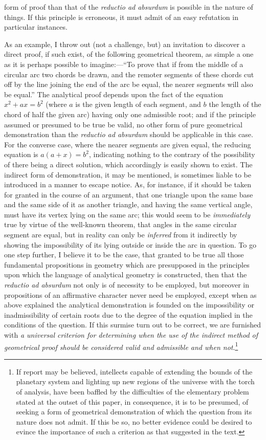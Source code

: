 \documentclass[11pt]{article}
\newcommand{\sourcepage}[1]{\marginpar{\scriptsize p.~#1}}
\begin{document}
{{\sourcepage{395}
form of proof than that of the \emph{reductio ad absurdum} is possible in the nature of things. If this principle is erroneous, it must admit of an easy refutation in particular instances.

As an example, I throw out (not a challenge, but) an invitation to discover a direct proof, if such exist, of the following geometrical theorem, as simple a one as it is perhaps possible to imagine:---``To prove that if from the middle of a circular arc two chords be drawn, and the remoter segments of these chords cut off by the line joining the end of the arc be equal, the nearer segments will also be equal.'' The analytical proof depends upon the fact of the equation $x^2+ax=b^2$ (where $a$ is the given length of each segment, and $b$ the length of the chord of half the given arc) having only one admissible root; and if the principle assumed or presumed to be true be valid, no other form of pure geometrical demonstration than the \emph{reductio ad absurdum} should be applicable in this case. For the converse case, where the nearer segments are given equal, the reducing equation is $a(a+x)=b^2$, indicating nothing to the contrary of the possibility of there being a direct solution, which accordingly is easily shown to exist. The indirect form of demonstration, it may be mentioned, is sometimes liable to be introduced in a manner to escape notice. As, for instance, if it should be taken for granted in the course of an argument, that one triangle upon the same base and the same side of it as another triangle, and having the same vertical angle, must have its vertex lying on the same arc; this would seem to be \emph{immediately} true by virtue of the well-known theorem, that angles in the same circular segment are equal, but in reality can only be \emph{inferred} from it indirectly by showing the impossibility of its lying outside or inside the arc in question. To go one step further, I believe it to be the case, that granted to be true all those fundamental propositions in geometry which are presupposed in the principles upon which the language of analytical geometry is constructed, then that the \emph{reductio ad absurdum} not only is of necessity to be employed, but moreover in propositions of an affirmative character never need be employed, except when as above explained the analytical demonstration is founded on the impossibility or inadmissibility of certain roots due to the degree of the equation implied in the conditions of the question. If this surmise turn out to be correct, we are furnished with \emph{a universal criterion for determining when the use of the indirect method of geometrical proof should be considered valid and admissible and when not}.\footnote{If report may be believed, intellects capable of extending the bounds of the planetary system and lighting up new regions of the universe with the torch of analysis, have been baffled by the difficulties of the elementary problem stated at the outset of this paper, in consequence, it is to be presumed, of seeking a form of geometrical demonstration of which the question from its nature does not admit. If this be so, no better evidence could be desired to evince the importance of such a criterion as that suggested in the text.}

}}
\end{document}
